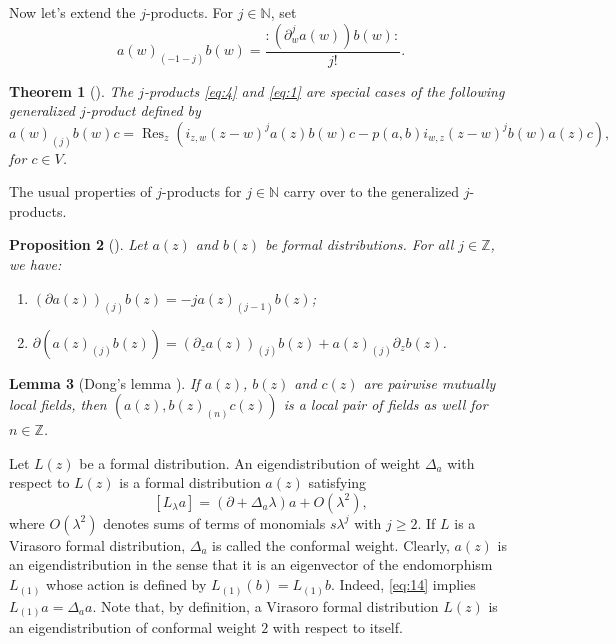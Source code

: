 \documentclass[a4paper, 12pt, reqno]{amsart}
\newtheorem{theorem}{Theorem}[section]
\newtheorem{lemma}[theorem]{Lemma}
\newtheorem{proposition}[theorem]{Proposition}
\theoremstyle{remark}
\numberwithin{equation}{subsection}
\DeclareMathOperator{\Res}{Res}
\begin{document}
Now let's extend the $j$-products.
For $j \in \mathbb{N}$, set
\begin{equation}
  \label{eq:13}
  a(w)_{(-1 - j)}b(w) = \frac{:(\partial^j_wa(w))b(w):}{j!}.
\end{equation}

\begin{theorem}[{\cite[Proposition 3.4.3]{nozaradan_introduction_2008}}]
  \label{thr:13}
  The $j$-products \eqref{eq:4} and \eqref{eq:1} are special cases of the following generalized $j$-product defined by
  \begin{equation*}
    a(w)_{(j)}b(w)c = \Res_z(i_{z, w}(z - w)^ja(z)b(w)c - p(a,b)i_{w, z}(z - w)^jb(w)a(z)c),
  \end{equation*}
  for $c \in V$.
\end{theorem}

The usual properties of $j$-products for $j \in \mathbb{N}$ carry over to the generalized $j$-products.

\begin{proposition}[{\cite[Proposition 3.4.4]{nozaradan_introduction_2008}}]
  \label{prp:6}
  Let $a(z)$ and $b(z)$ be formal distributions.
  For all $j \in \mathbb{Z}$, we have:
  \begin{enumerate}
  \item $(\partial a(z))_{(j)}b(z) = -ja(z)_{(j - 1)}b(z)$;
  \item $\partial(a(z)_{(j)}b(z)) = (\partial_za(z))_{(j)}b(z) + a(z)_{(j)}\partial_zb(z)$.
  \end{enumerate}
\end{proposition}

\begin{lemma}[Dong's lemma {\cite[Lemma 3.2]{kac_vertex_1998}}]
  \label{lmm:4}
  If $a(z)$, $b(z)$ and $c(z)$ are pairwise mutually local fields, then $(a(z),b(z)_{(n)}c(z))$ is a local pair of fields as well for $n \in \mathbb{Z}$.
\end{lemma}

Let $L(z)$ be a formal distribution.
An eigendistribution of weight $\Delta_a$ with respect to $L(z)$ is a formal distribution $a(z)$ satisfying
\begin{equation}
  \label{eq:14}
  [L_{\lambda}a] = (\partial + \Delta_a\lambda)a + O(\lambda^2),
\end{equation}
where $O(\lambda^2)$ denotes sums of terms of monomials $s\lambda^j$ with $j \ge 2$.
If $L$ is a Virasoro formal distribution, $\Delta_a$ is called the conformal weight.
Clearly, $a(z)$ is an eigendistribution in the sense that it is an eigenvector of the endomorphism $L_{(1)}$ whose action is defined by $L_{(1)}(b) = L_{(1)}b$.
Indeed, \eqref{eq:14} implies $L_{(1)}a = \Delta_aa$.
Note that, by definition, a Virasoro formal distribution $L(z)$ is an eigendistribution of conformal weight $2$ with respect to itself.
\end{document}
